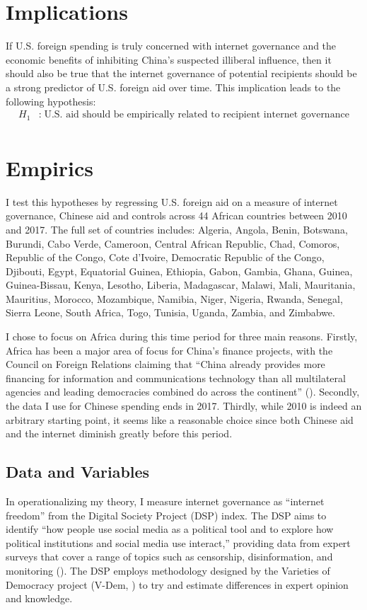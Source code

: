 \documentclass[12pt]{article}
\begin{document}
\section*{Implications}
If U.S. foreign spending is truly concerned with internet governance and the economic benefits of inhibiting China's suspected illiberal influence, then it should also be true that the internet governance of potential recipients should be a strong predictor of U.S. foreign aid over time. This implication leads to the following hypothesis:
\begin{align*}
    H_{1}&:\;\text{U.S. aid should be empirically related to recipient internet governance}\\
\end{align*}

\section*{Empirics}
I test this hypotheses by regressing U.S. foreign aid on a measure of internet governance, Chinese aid and controls across 44 African countries between 2010 and 2017. The full set of countries includes: Algeria, Angola, Benin, Botswana, Burundi, Cabo Verde, Cameroon, Central African Republic, Chad, Comoros, Republic of the Congo, Cote d'Ivoire, Democratic Republic of the Congo, Djibouti, Egypt, Equatorial Guinea, Ethiopia, Gabon, Gambia, Ghana, Guinea, Guinea-Bissau, Kenya, Lesotho, Liberia, Madagascar, Malawi, Mali, Mauritania, Mauritius, Morocco, Mozambique, Namibia, Niger, Nigeria, Rwanda, Senegal, Sierra Leone, South Africa, Togo, Tunisia, Uganda, Zambia, and Zimbabwe. 

I chose to focus on Africa during this time period for three main reasons. Firstly, Africa has been a major area of focus for China's finance projects, with the Council on Foreign Relations claiming that ``China already provides more financing for information and communications technology than all multilateral agencies and leading democracies combined do across the continent'' (\cite{kurlantzicketal.2020}). Secondly, the data I use for Chinese spending ends in 2017. Thirdly, while 2010 is indeed an arbitrary starting point, it seems like a reasonable choice since both Chinese aid and the internet diminish greatly before this period.

\subsection*{Data and Variables}
In operationalizing my theory, I measure internet governance as ``internet freedom'' from the Digital Society Project (DSP) index. The DSP aims to identify ``how people use social media as a political tool and to explore how political institutions and social media use interact,'' providing data from expert surveys that cover a range of topics such as censorship, disinformation, and monitoring (\cite{mechkova2022}). The DSP employs methodology designed by the Varieties of Democracy project (V-Dem, \cite{coppedge2022}) to try and estimate differences in expert opinion and knowledge.
\end{document}
